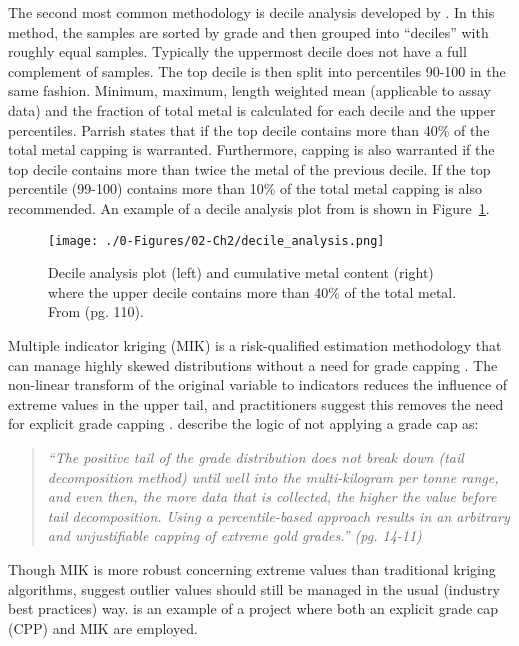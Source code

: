The second most common methodology is decile analysis developed by \cite{parrish1997geologist}. In this method, the samples are sorted by grade and then grouped into ``deciles'' with roughly equal samples. Typically the uppermost decile does not have a full complement of samples. The top decile is then split into percentiles 90-100 in the same fashion. Minimum, maximum, length weighted mean (applicable to assay data) and the fraction of total metal is calculated for each decile and the upper percentiles. Parrish states that if the top decile contains more than 40\% of the total metal capping is warranted. Furthermore, capping is also warranted if the top decile contains more than twice the metal of the previous decile. If the top percentile (99-100) contains more than 10\% of the total metal capping is also recommended. An example of a decile analysis plot from \cite{cartier2020} is shown in Figure~\ref{fig:decile}.

\begin{figure}[htb!]
    \centering
    \texttt{[image: ./0-Figures/02-Ch2/decile\_analysis.png]}
    \caption{Decile analysis plot (left) and cumulative metal content (right) where the upper decile contains more than 40\% of the total metal. From \cite{cartier2020} (pg. 110).}
    \label{fig:decile}
\end{figure}

Multiple indicator kriging (MIK) is a risk-qualified estimation methodology that can manage highly skewed distributions without a need for grade capping \citep{journel1983nonparametric}. The non-linear transform of the original variable to indicators reduces the influence of extreme values in the upper tail, and practitioners suggest this removes the need for explicit grade capping \citep{pretium2020, ngm2020, tristar2021, cardinal2019}. \cite{pretium2020} describe the logic of not applying a grade cap as:
\blockquote{\textit{``The positive tail of the grade distribution does
        not break down (tail decomposition method) until well into the multi-kilogram per tonne range, and even then, the more data that is collected, the higher the value before tail decomposition. Using a percentile-based approach results in an arbitrary and unjustifiable capping of extreme gold grades.'' (pg. 14-11)}}
Though MIK is more robust concerning extreme values than traditional kriging algorithms, \cite{carvalho2017overview} suggest outlier values should still be managed in the usual (industry best practices) way. \cite{artemis2020} is an example of a project where both an explicit grade cap (CPP) and MIK are employed.

